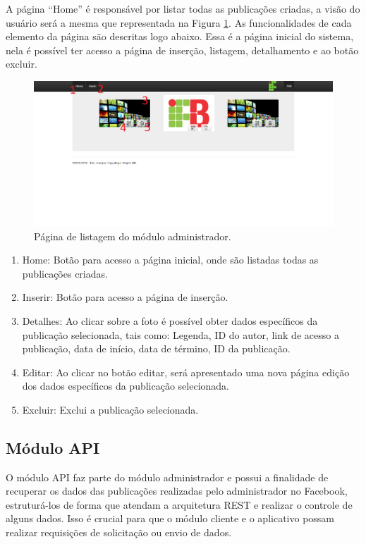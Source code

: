 A página ``Home'' é responsável por listar todas as publicações criadas, a visão do usuário será a mesma que representada na Figura \ref{fig:administrador2}. As funcionalidades de cada elemento da página são descritas logo abaixo. Essa é a página inicial do sistema, nela é possível ter acesso a página de inserção, listagem, detalhamento e ao botão excluir.

\begin{figure}[H]
\centering
\includegraphics[width=\textwidth]{figuras/administrador2}
\caption{Página de listagem  do módulo administrador.}
\label{fig:administrador2}
\end{figure}

\begin{enumerate}
   \item Home: Botão para acesso a página inicial, onde são listadas todas as publicações criadas.
   \item Inserir: Botão para acesso a página de inserção.
   \item Detalhes: Ao clicar sobre a foto é possível obter dados específicos da publicação selecionada, tais como: Legenda, ID do autor, link de acesso a publicação, data de início, data de término, ID da publicação.
   \item Editar: Ao clicar no botão editar, será apresentado uma nova página edição dos dados específicos da publicação selecionada.
   \item Excluir: Exclui a publicação selecionada.
 \end{enumerate}

\subsection{Módulo API}
O módulo API faz parte do módulo administrador e possui a finalidade de recuperar os dados das publicações realizadas pelo administrador no Facebook, estruturá-los de forma que atendam a arquitetura REST e realizar o controle de alguns dados. Isso é crucial para que o módulo cliente e o aplicativo possam realizar requisições de solicitação ou envio de dados.

